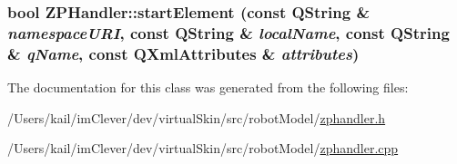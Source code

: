 \label{class_robot_model_1_1_z_p_handler_a442f6837417a1baa0d60641ddd854109}
\hypertarget{class_robot_model_1_1_z_p_handler_a4041ee7deb5a59d83d6eab98101844d9}{
\subsubsection[{startElement}]{\setlength{\rightskip}{0pt plus 5cm}bool ZPHandler::startElement (const QString \& {\em namespaceURI}, \/  const QString \& {\em localName}, \/  const QString \& {\em qName}, \/  const QXmlAttributes \& {\em attributes})}}
\label{class_robot_model_1_1_z_p_handler_a4041ee7deb5a59d83d6eab98101844d9}


The documentation for this class was generated from the following files:\begin{DoxyCompactItemize}
\item 
/Users/kail/imClever/dev/virtualSkin/src/robotModel/\hyperlink{zphandler_8h}{zphandler.h}\item 
/Users/kail/imClever/dev/virtualSkin/src/robotModel/\hyperlink{zphandler_8cpp}{zphandler.cpp}\end{DoxyCompactItemize}
